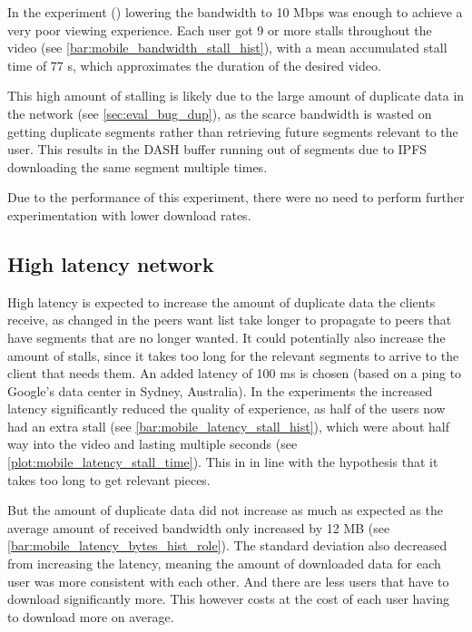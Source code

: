 In the experiment () lowering the bandwidth to 10 \ac{Mbps} was enough to achieve a very poor viewing experience. Each user got 9 or more stalls throughout the video (see \autoref{bar:mobile_bandwidth_stall_hist}), with a mean accumulated stall time of 77 \ac{s}, which approximates the duration of the desired video.

This high amount of stalling is likely due to the large amount of duplicate data in the network (see \autoref{sec:eval_bug_dup}), as the scarce bandwidth is wasted on getting duplicate segments rather than retrieving future segments relevant to the user. This results in the \ac{DASH} buffer running out of segments due to \ac{IPFS} downloading the same segment multiple times.

Due to the performance of this experiment, there were no need to perform further experimentation with lower download rates.

\if{}

\fi

\subsection{High latency network}
\label{sec:eval_high_latency}
High latency is expected to increase the amount of duplicate data the clients receive, as changed in the peers want list take longer to propagate to peers that have segments that are no longer wanted. It could potentially also increase the amount of stalls, since it takes too long for the relevant segments to arrive to the client that needs them. An added latency of 100 \ac{ms} is chosen (based on a ping to Google's data center in Sydney, Australia).
In the experiments the increased latency significantly reduced the quality of experience, as half of the users now had an extra stall (see \autoref{bar:mobile_latency_stall_hist}), which were about half way into the video and lasting multiple seconds (see \autoref{plot:mobile_latency_stall_time}). This in in line with the hypothesis that it takes too long to get relevant pieces.

\if{}


\fi

But the amount of duplicate data did not increase as much as expected as the average amount of received bandwidth only increased by 12 \ac{MB} (see \autoref{bar:mobile_latency_bytes_hist_role}). The standard deviation also decreased from increasing the latency, meaning the amount of downloaded data for each user was more consistent with each other. And there are less users that have to download significantly more. This however costs at the cost of each user having to download more on average.

